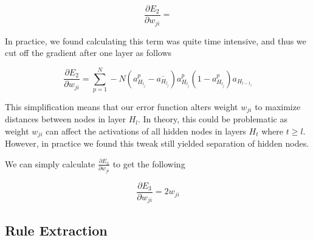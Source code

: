 \begin{equation}
  \frac{\partial E_2}{\partial w_{ji}} = 
\end{equation}

In practice, we found calculating this term was quite time intensive, and thus
we cut off the gradient after one layer as follows

\begin{equation}
  \frac{\partial E_2}{\partial w_{ji}} = \sum_{p=1}^{N} -N(a_{H_{l_j}}^p - \overline{a_{H_{l_j}}})a_{H_{l_j}}^p(1-a_{H_{l_j}}^p)a_{H_{l-1_i}}
\end{equation}

This simplification means that our error function alters weight
$w_{ji}$ to maximize distances between nodes in layer $H_{l}$. In theory, this
could be problematic as weight $w_{ji}$ can affect the activations of all
hidden nodes in layers $H_{t}$ where $t \geq l$. However, in practice we
found this tweak still yielded separation of hidden nodes.

We can simply calculate $\frac{\partial E_3}{\partial w_{ji}}$ to get the following

\begin{equation}
  \frac{\partial E_3}{\partial w_{ji}} = 2 w_{ji}
\end{equation}

\subsection{Rule Extraction}
\label{sec:re}

